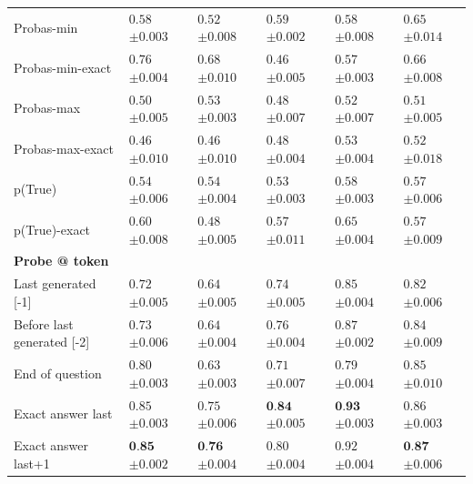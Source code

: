 \begin{table}[t]
{\begin{tabular}{l|lllll}
Probas-min & $0.58$ \tiny$\pm 0.003$ & $0.52$ \tiny$\pm 0.008$ & $0.59$ \tiny$\pm 0.002$ & $0.58$ \tiny$\pm 0.008$ & $0.65$ \tiny$\pm 0.014$ \\
Probas-min-exact & $0.76$ \tiny$\pm 0.004$ & $0.68$ \tiny$\pm 0.010$ & $0.46$ \tiny$\pm 0.005$ & $0.57$ \tiny$\pm 0.003$ & $0.66$ \tiny$\pm 0.008$ \\
Probas-max & $0.50$ \tiny$\pm 0.005$ & $0.53$ \tiny$\pm 0.003$ & $0.48$ \tiny$\pm 0.007$ & $0.52$ \tiny$\pm 0.007$ & $0.51$ \tiny$\pm 0.005$ \\
Probas-max-exact & $0.46$ \tiny$\pm 0.010$ & $0.46$ \tiny$\pm 0.010$ & $0.48$ \tiny$\pm 0.004$ & $0.53$ \tiny$\pm 0.004$ & $0.52$ \tiny$\pm 0.018$ \\
p(True) & $0.54$ \tiny$\pm 0.006$ & $0.54$ \tiny$\pm 0.004$ & $0.53$ \tiny$\pm 0.003$ & $0.58$ \tiny$\pm 0.003$ & $0.57$ \tiny$\pm 0.006$ \\
p(True)-exact & $0.60$ \tiny$\pm 0.008$ & $0.48$ \tiny$\pm 0.005$ & $0.57$ \tiny$\pm 0.011$ & $0.65$ \tiny$\pm 0.004$ & $0.57$ \tiny$\pm 0.009$ \\
\midrule
\textbf{Probe @ token} \\
\midrule

Last generated [-1] & $0.72$ \tiny$\pm 0.005$ & $0.64$ \tiny$\pm 0.005$ & $0.74$ \tiny$\pm 0.005$ & $0.85$ \tiny$\pm 0.004$ & $0.82$ \tiny$\pm 0.006$ \\
Before last generated [-2] & $0.73$ \tiny$\pm 0.006$ & $0.64$ \tiny$\pm 0.004$ & $0.76$ \tiny$\pm 0.004$ & $0.87$ \tiny$\pm 0.002$ & $0.84$ \tiny$\pm 0.009$ \\
End of question & $0.80$ \tiny$\pm 0.003$ & $0.63$ \tiny$\pm 0.003$ & $0.71$ \tiny$\pm 0.007$ & $0.79$ \tiny$\pm 0.004$ & $0.85$ \tiny$\pm 0.010$ \\
\midrule
Exact answer last & $0.85$ \tiny$\pm 0.003$ & $0.75$ \tiny$\pm 0.006$ & $\textbf{0.84}$ \tiny$\pm 0.005$ & $\textbf{0.93}$ \tiny$\pm 0.003$ & $0.86$ \tiny$\pm 0.003$ \\
Exact answer last+1 & $\textbf{0.85}$ \tiny$\pm 0.002$ & $\textbf{0.76}$ \tiny$\pm 0.004$ & $0.80$ \tiny$\pm 0.004$ & $0.92$ \tiny$\pm 0.004$ & $\textbf{0.87}$ \tiny$\pm 0.006$ \\
     \bottomrule
    \end{tabular}
    }
    \label{tab:mistral_instruct_error_detection}
\end{table}
